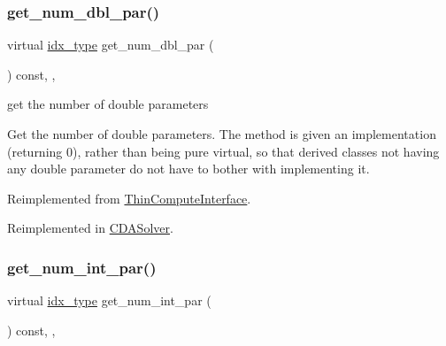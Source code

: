 \subsubsection{\texorpdfstring{get\+\_\+num\+\_\+dbl\+\_\+par()}{get\_num\_dbl\_par()}}
{\footnotesize\ttfamily virtual \mbox{\hyperlink{class_s_m_spp__di__unipi__it_1_1_thin_compute_interface_aa3d710629ad8c434286726ad810c3b47}{idx\+\_\+type}} get\+\_\+num\+\_\+dbl\+\_\+par (\begin{DoxyParamCaption}\item[{void}]{ }\end{DoxyParamCaption}) const\hspace{0.3cm}{\ttfamily [inline]}, {\ttfamily [override]}, {\ttfamily [virtual]}}



get the number of double parameters 

Get the number of double parameters. The method is given an implementation (returning 0), rather than being pure virtual, so that derived classes not having any double parameter do not have to bother with implementing it. 

Reimplemented from \mbox{\hyperlink{class_s_m_spp__di__unipi__it_1_1_thin_compute_interface_a03d2492bc7caa7e7821fa1bc4f06a36e}{Thin\+Compute\+Interface}}.



Reimplemented in \mbox{\hyperlink{class_s_m_spp__di__unipi__it_1_1_c_d_a_solver_a842fd454acaded84baf6b77e0d61a950}{C\+D\+A\+Solver}}.

\mbox{\label{class_s_m_spp__di__unipi__it_1_1_solver_a3ad74d9506761eb2ca4c8a936fb7a1c5}} 
\subsubsection{\texorpdfstring{get\+\_\+num\+\_\+int\+\_\+par()}{get\_num\_int\_par()}}
{\footnotesize\ttfamily virtual \mbox{\hyperlink{class_s_m_spp__di__unipi__it_1_1_thin_compute_interface_aa3d710629ad8c434286726ad810c3b47}{idx\+\_\+type}} get\+\_\+num\+\_\+int\+\_\+par (\begin{DoxyParamCaption}\item[{void}]{ }\end{DoxyParamCaption}) const\hspace{0.3cm}{\ttfamily [inline]}, {\ttfamily [override]}, {\ttfamily [virtual]}}



